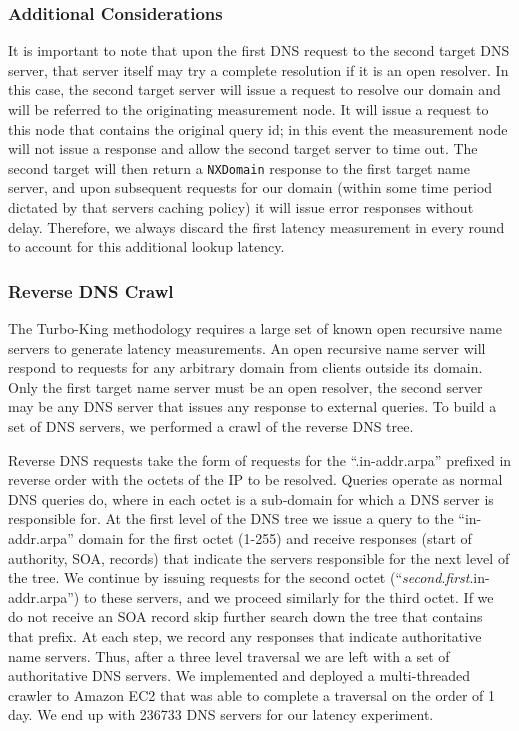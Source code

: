 \subsubsection{Additional Considerations}
It is important to note that upon the first DNS request to the second target DNS server, that server itself may try a complete resolution if it is an open resolver. In this case, the second target server will issue a request to resolve our domain and will be referred to the originating measurement node. It will issue a request to this node that contains the original query id; in this event the measurement node will not issue a response and allow the second target server to time out. The second target will then return a \texttt{NXDomain} response to the first target name server, and upon subsequent requests for our domain (within some time period dictated by that servers caching policy) it will issue error responses without delay. Therefore, we always discard the first latency measurement in every round to account for this additional lookup latency.

\subsubsection{Reverse DNS Crawl}
The Turbo-King methodology requires a large set of known open recursive name servers to generate latency measurements. An open recursive name server will respond to requests for any arbitrary domain from clients outside its domain. Only the first target name server must be an open resolver, the second server may be any DNS server that issues any response to external queries. To build a set of DNS servers, we performed a crawl of the reverse DNS tree.

Reverse DNS requests take the form of requests for the ``.in-addr.arpa'' prefixed in reverse order with the octets of the IP to be resolved. Queries operate as normal DNS queries do, where in each octet is a sub-domain for which a DNS server is responsible for.
At the first level of the DNS tree we issue a query to the ``in-addr.arpa'' domain for the first octet (1-255) and receive responses (start of authority, SOA, records) that indicate the servers responsible for the next level of the tree. We continue by issuing requests for the second octet (``{\it second}.{\it first}.in-addr.arpa'') to these servers, and we proceed similarly for the third octet. If we do not receive an SOA record skip further search down the tree that contains that prefix. At each step, we record any responses that indicate authoritative name servers. Thus, after a three level traversal we are left with a set of authoritative DNS servers. We implemented and deployed a multi-threaded crawler to Amazon EC2 that was able to complete a traversal on the order of 1 day. We end up with 236733 DNS servers for our latency experiment.

